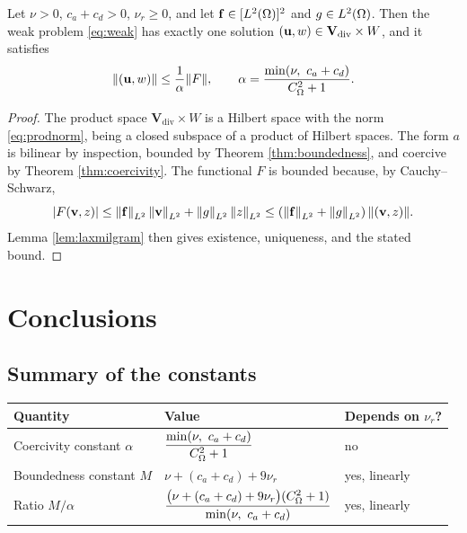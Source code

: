 \documentclass[11pt,a4paper]{article}
\begin{document}
\begin{theorem}\label{thm:wellposed}
Let $\nu > 0$, $c_{a}+c_{d} > 0$, $\nu_{r} \ge 0$, and let
$\mathbf{f} \in [L^{2}(\Omega)]^{2}$ and $g \in L^{2}(\Omega)$. Then the weak problem
\eqref{eq:weak} has exactly one solution
$(\mathbf{u}, w) \in \mathbf{V}_{\mathrm{div}} \times W$, and it satisfies
\[
  \lVert (\mathbf{u},w) \rVert
  \le \frac{1}{\alpha} \lVert F \rVert ,
  \qquad
  \alpha = \frac{\min(\nu,\ c_{a}+c_{d})}{C_\Omega^{2}+1} .
\]
\end{theorem}

\begin{proof}
The product space $\mathbf{V}_{\mathrm{div}} \times W$ is a Hilbert space with
the norm \eqref{eq:prodnorm}, being a closed subspace of a product of Hilbert
spaces. The form $a$ is bilinear by inspection, bounded by Theorem
\ref{thm:boundedness}, and coercive by Theorem \ref{thm:coercivity}. The
functional $F$ is bounded because, by Cauchy--Schwarz,
\[
  \left\lvert F(\mathbf{v},z) \right\rvert \le \left\lVert \mathbf{f} \right\rVert_{L^{2}}\left\lVert \mathbf{v} \right\rVert_{L^{2}} + \left\lVert g \right\rVert_{L^{2}}\left\lVert z \right\rVert_{L^{2}}
  \le \left( \left\lVert \mathbf{f} \right\rVert_{L^{2}} + \left\lVert g \right\rVert_{L^{2}} \right) \lVert (\mathbf{v},z) \rVert .
\]
Lemma \ref{lem:laxmilgram} then gives existence, uniqueness, and the stated
bound.
\end{proof}

\section{Conclusions}
\label{sec:conclusions}

\subsection{Summary of the constants}

\begin{center}
\begin{tabular}{@{}lll@{}}
\toprule
Quantity & Value & Depends on $\nu_{r}$? \\
\midrule
Coercivity constant $\alpha$
  & $\dfrac{\min(\nu,\ c_{a}+c_{d})}{C_\Om^{2}+1}$ & no \\[3mm]
Boundedness constant $M$
  & $\nu + (c_{a}+c_{d}) + 9\nu_{r}$ & yes, linearly \\[2mm]
Ratio $M/\alpha$
  & $\dfrac{\big(\nu + (c_{a}+c_{d}) + 9\nu_{r}\big)(C_\Omega^{2}+1)}
           {\min(\nu,\ c_{a}+c_{d})}$ & yes, linearly \\
\bottomrule
\end{tabular}
\end{center}
\end{document}
